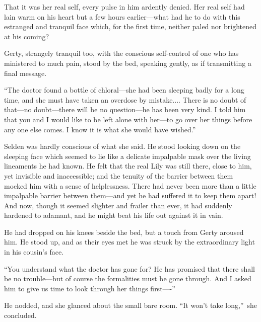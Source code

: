 \documentclass[12pt,a4paper]{book}
\begin{document}
That it was her real self, every pulse in him ardently denied. 
Her real self had lain warm on his heart but a few hours
earlier---what had he to do with this estranged and tranquil face
which, for the first time, neither paled nor brightened at his
coming?





Gerty, strangely tranquil too, with the conscious self-control of
one who has ministered to much pain, stood by the bed, speaking
gently, as if transmitting a final message.





``The doctor found a bottle of chloral---she had been sleeping
badly for a long time, and she must have taken an overdose by
mistake.... There is no doubt of that---no doubt---there will be no
question---he has been very kind. I told him that you and I would
like to be left alone with her---to go over her things before any
one else comes. I know it is what she would have wished.''





Selden was hardly conscious of what she said. He stood
looking down on the sleeping face which seemed to lie like a
delicate impalpable mask over the living lineaments he had known. 
He felt that the real Lily was still there, close to him, yet
invisible and inaccessible; and the tenuity of the barrier
between them mocked him with a sense of helplessness. There had
never been more than a little impalpable barrier between
them---and yet he had suffered it to keep them apart! And now,
though it seemed slighter and frailer than ever, it had suddenly
hardened to adamant, and he might beat his life out against it in
vain.





He had dropped on his knees beside the bed, but a touch from
Gerty aroused him. He stood up, and as their eyes met he was
struck by the extraordinary light in his cousin's face.





``You understand what the doctor has gone for? He has promised
that there shall be no trouble---but of course the formalities
must be gone through. And I asked him to give us time to look
through her things first----''





He nodded, and she glanced about the small bare room. ``It won't
take long,''\ she concluded.
\end{document}
